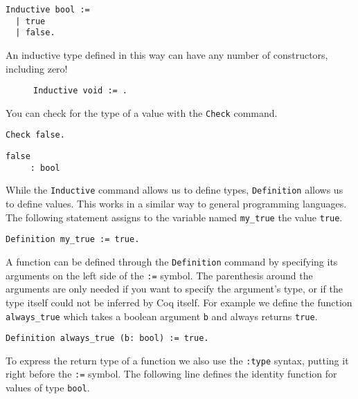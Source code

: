 \begin{verbatim}
Inductive bool := 
  | true
  | false.
\end{verbatim}

An inductive type defined in this way can have any number of constructors, including zero!

\begin{figure}[!ht]
\begin{verbatim}
Inductive void := .
\end{verbatim}
\label{lst:void}
\end{figure}

You can check for the type of a value with the \texttt{Check} command.

\begin{verbatim}
Check false. 
\end{verbatim}
\vspace{-\baselineskip*3/2}
\begin{verbatim}
false
     : bool
\end{verbatim}

While the \texttt{Inductive} command allows us to define types, \texttt{Definition}
allows us to define values. This works in a similar way to general programming languages. The 
following statement assigns to the variable named \texttt{my_true} the value 
\texttt{true}.

\begin{verbatim}
Definition my_true := true.
\end{verbatim}

A function can be defined through the \texttt{Definition} command by specifying its arguments on
the left side of the \texttt{:=} symbol. The parenthesis around the arguments are only needed if you 
want to specify the argument's type, or if the type itself could not be inferred by Coq itself. For 
example we define the function \texttt{always_true} which takes a boolean argument 
\texttt{b} and always returns \texttt{true}.

\begin{verbatim}
Definition always_true (b: bool) := true.
\end{verbatim}

To express the return type of a function we also use the \texttt{:type} syntax, putting it 
right before the \texttt{:=} symbol. The following line defines the identity function for
values of type \texttt{bool}.

